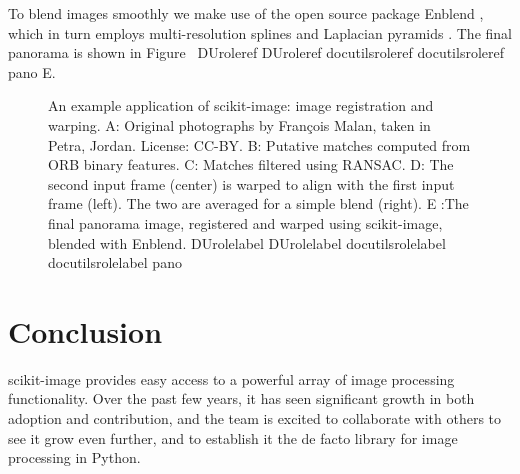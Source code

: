 \documentclass[fleqn,12pt]{wlpeerj}
\providecommand*{\DUrole}[2]{%
  \ifcsname DUrole#1\endcsname%
    \csname DUrole#1\endcsname{#2}%
  \else%
    \ifcsname docutilsrole#1\endcsname%
      \csname docutilsrole#1\endcsname{#2}%
    \else%
      #2%
    \fi%
  \fi%
}
\begin{document}
To blend images smoothly we make use of the open source package Enblend
\citep{Enblend}, which in turn employs multi-resolution splines and Laplacian
pyramids \citep{burt_adelson_0,burt_adelson_1}.  The final panorama is shown in
Figure~\DUrole{ref}{pano} E.\begin{figure}[bht]\noindent{}
\caption{An example application of scikit-image: image registration and warping.
A: Original photographs by François Malan, taken in Petra, Jordan. License:
CC-BY.
B: Putative matches computed from ORB binary features.
C: Matches filtered using RANSAC.
D: The second input frame (center) is warped to align with the first input
frame (left). The two are averaged for a simple blend (right).
E :The final panorama image, registered and warped using scikit-image,
blended with Enblend.
\DUrole{label}{pano}}
\end{figure}

\section*{Conclusion}
  \label{conclusion}

scikit-image provides easy access to a powerful array of image processing
functionality.  Over the past few years, it has seen significant growth in both
adoption and contribution, and the team is excited to collaborate with others
to see it grow even further, and to establish it the de facto library for image
processing in Python.
\end{document}
